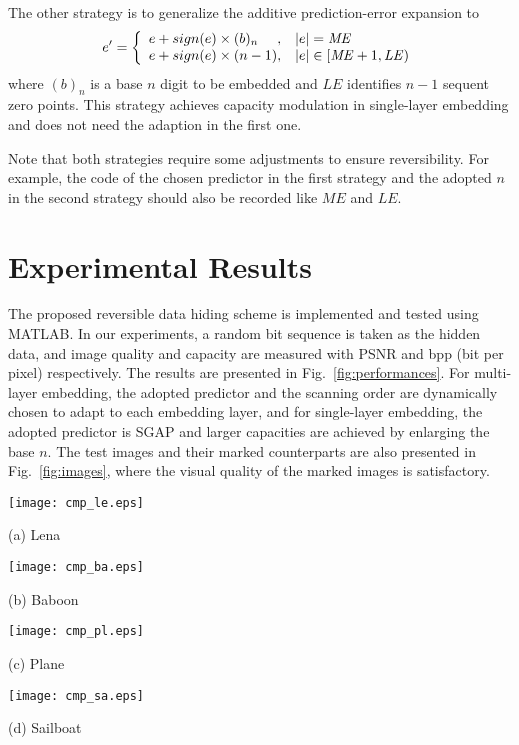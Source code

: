 \documentclass{sig-alternate}
\begin{document}
The other strategy is to generalize the additive prediction-error expansion to
\begin{equation}\label{eqn:ape2}
 e' = \left\{ \begin{array}{l@{,\quad}l}
  e + sign(e) \times (b)_n & |e| = \mathit{ME} \\
  e + sign(e) \times (n-1) & |e| \in [\mathit{ME}+1,\mathit{LE}) \\
\end{array} \right.
\end{equation}
where $(b)_n$ is a base $n$ digit to be embedded and $\mathit{LE}$ identifies $n-1$ sequent zero
points. This strategy achieves capacity modulation in single-layer embedding and does not need the
adaption in the first one.

Note that both strategies require some adjustments to ensure reversibility. For example, the code of
the chosen predictor in the first strategy and the adopted $n$ in the second strategy should also be
recorded like $\mathit{ME}$ and $\mathit{LE}$.

\section{Experimental Results}\label{sec:results}

The proposed reversible data hiding scheme is implemented and tested using MATLAB. In our
experiments, a random bit sequence is taken as the hidden data, and image quality and capacity are
measured with PSNR and bpp (bit per pixel) respectively. The results are presented in Fig.\
\ref{fig:performances}. For multi-layer embedding, the adopted predictor and the scanning order are
dynamically chosen to adapt to each embedding layer, and for single-layer embedding, the adopted
predictor is SGAP and larger capacities are achieved by enlarging the base $n$. The test images and
their marked counterparts are also presented in Fig.\ \ref{fig:images}, where the visual quality of
the marked images is satisfactory.

\begin{figure*}[t]
  \begin{minipage}[t]{.49\linewidth}
      \centering
      \texttt{[image: cmp\_le.eps]}
      \centerline{(a) Lena}
  \end{minipage}
  \hfill
  \begin{minipage}[t]{.49\linewidth}
      \centering
      \texttt{[image: cmp\_ba.eps]}
      \centerline{(b) Baboon}
  \end{minipage}

  \begin{minipage}[b]{.49\linewidth}
      \centering
      \texttt{[image: cmp\_pl.eps]}
      \centerline{(c) Plane}
  \end{minipage}
  \hfill
  \begin{minipage}[b]{.49\linewidth}
      \centering
      \texttt{[image: cmp\_sa.eps]}
      \centerline{(d) Sailboat}
  \end{minipage}
  \caption{\label{fig:performances}The performance evaluation of the proposed scheme over standard
  test images.}
\end{figure*}
\end{document}
